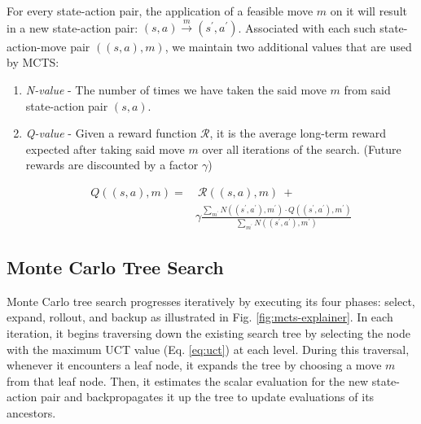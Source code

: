 \documentclass[%
 reprint,
amsmath,amssymb,showkeys,
pra,
]{revtex4-2}
\begin{document}

For every state-action pair, the application of a feasible move $m$ on it will result in a new state-action pair: $(s,a) \xrightarrow[]{m} (s^\prime,a^\prime)$. Associated with each such state-action-move pair $((s, a), m)$, we maintain two additional values that are used by MCTS:

\begin{enumerate}[label=(\roman*), noitemsep]
\item \textit{N-value} - The number of times we have taken the said move $m$ from said state-action pair $(s,a)$.
\item \textit{Q-value} - Given a reward function $\mathcal{R}$, it is the average long-term reward expected after taking said move $m$ over all iterations of the search. (Future rewards are discounted by a factor $\gamma$)

\begin{equation}
\begin{split}
    Q((s,a), m) =&\ \mathcal{R}((s,a), m)\ + \\ & \gamma \frac{\sum_{m^\prime} N((s^\prime, a^\prime), m^\prime) \cdot Q((s^\prime, a^\prime), m^\prime)}{\sum_{m^\prime} N((s^\prime, a^\prime), m^\prime)}
\end{split}
\end{equation}

\end{enumerate}

\subsection{\label{sec:method-mcts} Monte Carlo Tree Search}

Monte Carlo tree search progresses iteratively by executing its four phases: select, expand, rollout, and backup as illustrated in Fig. \ref{fig:mcts-explainer}. In each iteration, it begins traversing down the existing search tree by selecting the node with the maximum UCT value (Eq. \ref{eq:uct}) at each level. During this traversal, whenever it encounters a leaf node, it expands the tree by choosing a move $m$ from that leaf node. Then, it estimates the scalar evaluation for the new state-action pair and backpropagates it up the tree to update evaluations of its ancestors.
\end{document}
